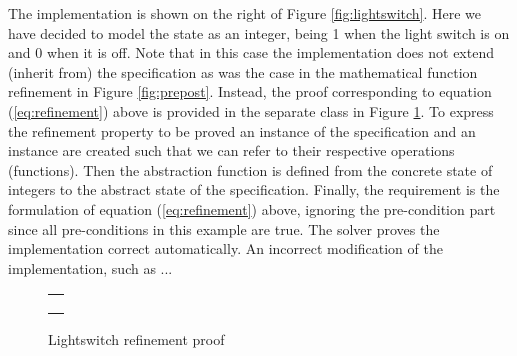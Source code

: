 The implementation is shown on the right of Figure \ref{fig:lightswitch}.
Here we have decided to model the state as an integer, being 1 when the light 
switch is on and 0 when it is off. Note that in this case the implementation
does not extend (inherit from) the specification as was the case in the 
mathematical function refinement in Figure \ref{fig:prepost}. Instead, the
proof corresponding to equation (\ref{eq:refinement}) above is provided
in the separate class  in Figure \ref{fig:lightswitch-proof}.
To express the refinement property to be proved an instance  of the
specification and an instance  are created such that we can refer to their respective operations (functions). Then the abstraction function  is defined from the concrete state of integers to the abstract state 
of the specification. Finally, the requirement is the \Klang{} formulation of 
equation (\ref{eq:refinement}) above, ignoring the pre-condition part since all
pre-conditions in this example are true. The \Klang{} solver proves the
implementation correct automatically. An incorrect modification of the implementation, such as ...


\begin{figure}
\centering
\begin{tabular}{c}
\hline \\
 \\ \\
\hline
\end{tabular}
\caption{Lightswitch refinement proof}
\label{fig:lightswitch-proof}
\end{figure}
